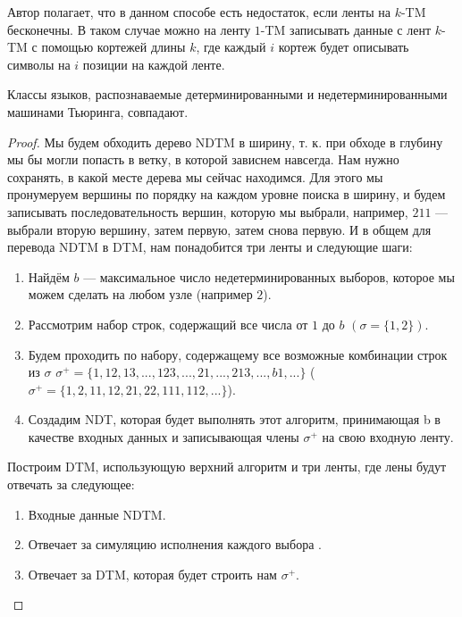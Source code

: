     \begin{Rem}
        Автор полагает, что в данном способе есть недостаток, если ленты на $k$-TM бесконечны. 
        В таком случае можно на ленту $1$-TM записывать данные с лент $k$-TM с помощью кортежей длины $k$, где каждый $i$ кортеж будет описывать символы на $i$ позиции на каждой ленте.
    \end{Rem}
    \begin{Thm}
    Классы языков, распознаваемые детерминированными и недетерминированными машинами Тьюринга, совпадают.
    \end{Thm}
    \begin{proof}
        \par Мы будем обходить дерево NDTM в ширину, т. к. при обходе в глубину мы бы могли попасть в ветку, в которой зависнем навсегда. Нам нужно сохранять, в какой месте дерева мы сейчас находимся. Для этого мы пронумеруем вершины по порядку на каждом уровне поиска в ширину, и будем записывать последовательность вершин, которую мы выбрали, например, $211$ --- выбрали вторую вершину, затем первую, затем снова первую. И в общем для перевода NDTM в  DTM, нам понадобится три ленты и следующие шаги:
        \begin{enumerate}
            \item Найдём $b$ --- максимальное число недетерминированных выборов, которое мы можем сделать на любом узле (например $2$).
            \item Рассмотрим набор строк, содержащий все числа от $1$ до $b$ $(\sigma = \{1, 2\})$.
            \item Будем проходить по набору, содержащему все возможные комбинации строк из $\sigma$ $\sigma^+ = \{1, 12, 13, ..., 123, ..., 21, ..., 213, ..., b1, ...\}$ ($\sigma^+ = \{1, 2, 11, 12, 21, 22, 111, 112, ...\}$).
            \item Создадим NDT, которая будет выполнять этот алгоритм, принимающая b в качестве входных данных и записывающая члены $\sigma^+$ на свою входную ленту.
        \end{enumerate}
        \par Построим DTM, использующую верхний алгоритм и три ленты, где лены будут отвечать за следующее:
        \begin{enumerate}
            \item Входные данные NDTM.
            \item Отвечает за симуляцию исполнения каждого выбора .
            \item Отвечает за DTM, которая будет строить нам $\sigma^+$.
        \end{enumerate}


\end{proof}
